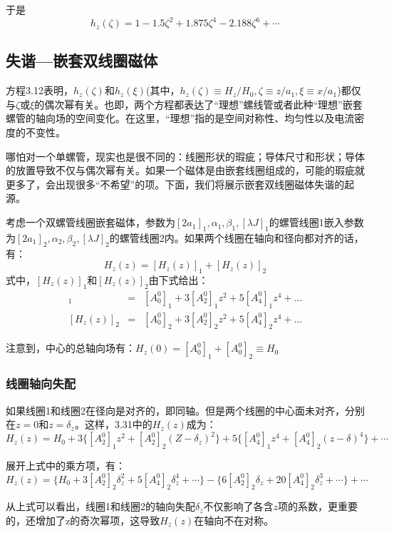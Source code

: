 于是
\begin{equation}
  h_z(\zeta)=1-1.5\zeta^2+1.875\zeta^4-2.188\zeta^6+\cdots
\end{equation}

\subsection{失谐—嵌套双线圈磁体}
方程3.12表明，$h_z(\zeta)$和$h_z(\xi)$(其中，$h_z(\zeta)\equiv H_z/H_0,\zeta\equiv z/a_1,\xi\equiv x/a_1$)都仅与$\zeta$或$\xi$的偶次幂有关。也即，两个方程都表达了“理想”螺线管或者此种“理想”嵌套螺管的轴向场的空间变化。在这里，“理想”指的是空间对称性、均匀性以及电流密度的不变性。

哪怕对一个单螺管，现实也是很不同的：线圈形状的瑕疵；导体尺寸和形状；导体的放置导致不仅与偶次幂有关。如果一个磁体是由嵌套线圈组成的，可能的瑕疵就更多了，会出现很多“不希望”的项。下面，我们将展示嵌套双线圈磁体失谐的起源。

考虑一个双螺管线圈嵌套磁体，参数为$[2a_1]_1,\alpha_1,\beta_1,[\lambda J]_1$的螺管线圈1嵌入参数为$[2a_1]_2,\alpha_2,\beta_2,[\lambda J]_2$的螺管线圈2内。如果两个线圈在轴向和径向都对齐的话，有：
\begin{equation}
H_z(z)=[H_z(z)]_1+[H_z(z)]_2
\end{equation}
式中，$[H_z(z)]_1$和$[H_z(z)]_2$由下式给出：
\begin{eqnarray}
  [H_z(z)]_1 &=& [A_0^0]_1 +3[A_2^0]_1 z^2+5[A_4^0]_1 z^4+... \\ \nonumber
  [H_z(z)]_2 &=& [A_0^0]_2 +3[A_2^0]_2 z^2+5[A_4^0]_2 z^4+...
\end{eqnarray}

注意到，中心的总轴向场有：$H_z(0)=[A_0^0]_1+[A_0^0]_2\equiv H_0$

\subsubsection{线圈轴向失配}
如果线圈1和线圈2在径向是对齐的，即同轴。但是两个线圈的中心面未对齐，分别在$z=0$和$z=\delta_z$。这样，3.31中的$H_z(z)$成为：
\begin{equation}
  H_z(z)=H_0+3\{ [A_2^0]_1 z^2+[A_2^0]_2(Z-\delta_z)^2\}+5\{[A_4^0]_1 z^4+[A_4^0]_2(z-\delta)^4\}+\cdots
\end{equation}

展开上式中的乘方项，有：
$$H_z(z)=\{H_0+3[A_2^0]_2 \delta_z^2+5[A_4^0]_2\delta_z^4+\cdots\}-\{6[A_2^0]_2\delta_z+20[A_4^0]_2\delta_z^3+\cdots\}+\cdots$$

从上式可以看出，线圈1和线圈2的轴向失配$\delta_z$不仅影响了各含$z$项的系数，更重要的，还增加了z的奇次幂项，这导致$H_z(z)$在轴向不在对称。


